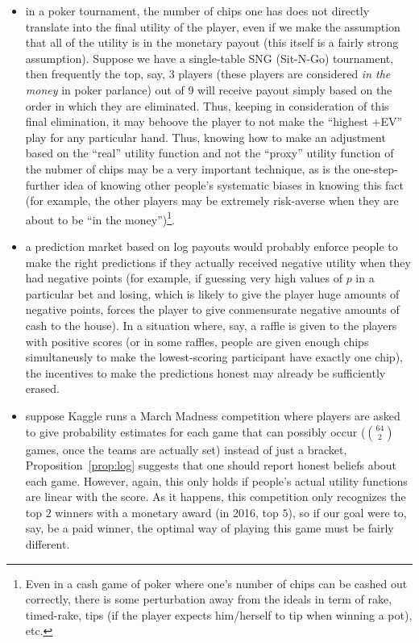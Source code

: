 \documentclass[12pt,twoside,singlespace]{article}
\numberwithin{equation}{section}
\theoremstyle{definition}
\begin{document}
\begin{itemize}
\item in a poker tournament, the number of chips one has does not directly translate into the final utility of the player, even if we make the assumption that all of the utility is in the monetary payout (this itself is a fairly strong assumption). Suppose we have a single-table SNG (Sit-N-Go) tournament, then frequently the top, say, 3 players (these players are considered \emph{in the money} in poker parlance) out of 9 will receive payout simply based on the order in which they are eliminated. Thus, keeping in consideration of this final elimination, it may behoove the player to not make the ``highest +EV'' play for any particular hand. Thus, knowing how to make an adjustment based on the ``real'' utility function and not the ``proxy'' utility function of the nubmer of chips may be a very important technique\cite{poker-tournaments}, as is the one-step-further idea of knowing other people's systematic biases in knowing this fact (for example, the other players may be extremely risk-averse when they are about to be ``in the money'')\footnote{Even in a cash game of poker where one's number of chips can be cashed out correctly, there is some perturbation away from the ideals in term of rake, timed-rake, tips (if the player expects him/herself to tip when winning a pot), etc.}.
\item a prediction market based on log payouts would probably enforce people to make the right predictions if they actually received negative utility when they had negative points (for example, if guessing very high values of $p$ in a particular bet and losing, which is likely to give the player huge amounts of negative points, forces the player to give conmensurate negative amounts of cash to the house). In a situation where, say, a raffle is given to the players with positive scores (or in some raffles, people are given enough chips simultaneusly to make the lowest-scoring participant have exactly one chip), the incentives to make the predictions honest may already be sufficiently erased.
\item suppose Kaggle runs a March Madness competition \cite{kaggle} where players are asked to give probability estimates for each game that can possibly occur (${64 \choose 2}$ games, once the teams are actually set) instead of just a bracket, Proposition~\ref{prop:log} suggests that one should report honest beliefs about each game. However, again, this only holds if people's actual utility functions are linear with the score. As it happens, this competition only recognizes the top $2$ winners with a monetary award (in 2016, top $5$), so if our goal were to, say, be a paid winner, the optimal way of playing this game must be fairly different.
\end{itemize}
\end{document}
